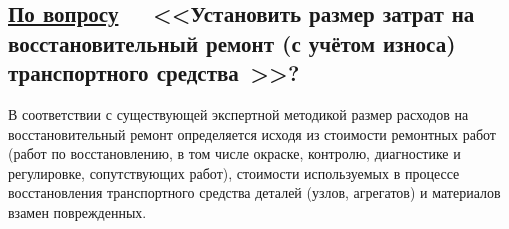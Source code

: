 \subsection{\underline{По  вопросу}\, \, \,	\textbf{\small{<<Установить размер затрат на восстановительный ремонт (с учётом износа) транспортного средства \tc \,>>?}}}
\renewcommand\baselinestretch{1.2}\small\normalsize
%
В соответствии с существующей экспертной методикой размер расходов на восстановительный ремонт определяется исходя из стоимости ремонтных работ (работ по восстановлению, в том числе окраске, контролю, диагностике и регулировке, сопутствующих работ), стоимости используемых в процессе восстановления транспортного средства деталей (узлов, агрегатов) и материалов взамен поврежденных. 
%                                         
%
%
